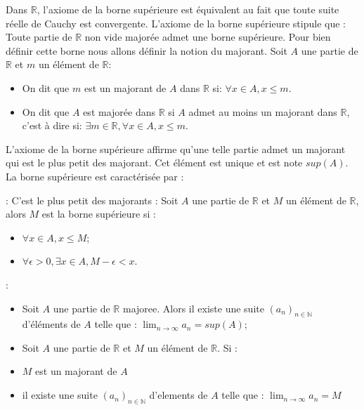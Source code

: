 \documentclass[letterpaper,10pt,french]{sphinxmanual}
\begin{document}
\sphinxAtStartPar
Dans \(\mathbb R\), l’axiome de la borne supérieure est équivalent au fait que toute suite réelle de Cauchy est convergente. L’axiome de la borne supérieure stipule que : Toute partie de \(\mathbb R\) non vide majorée admet une borne supérieure. Pour bien définir cette borne nous allons définir la notion du majorant.
Soit \(A\) une partie de \(\mathbb R\) et \(m\) un élément de \(\mathbb R\):
\begin{itemize}
\item {} 
\sphinxAtStartPar
On dit que \(m\) est un majorant de \(A\) dans \(\mathbb R\) si: \(\forall x \in A , x \leq m\).

\item {} 
\sphinxAtStartPar
On dit que \(A\) est majorée dans \(\mathbb R\) si \(A\) admet au moins un majorant dans \(\mathbb R\), c’est à dire si: \(\exists m \in \mathbb R, \forall x \in A , x \leq m\).

\end{itemize}

\sphinxAtStartPar
L’axiome de la borne supérieure affirme qu’une telle partie admet un majorant qui est le plus petit des majorant. Cet élément est unique et est note \(sup(A)\). La borne supérieure est caractérisée par :

\sphinxAtStartPar
{}: C’est le plus petit des majorants : Soit \(A\) une partie de \(\mathbb R\) et \(M\) un élément de \(\mathbb R\), alors \(M\) est la borne supérieure si :
\begin{itemize}
\item {} 
\sphinxAtStartPar
\(\forall x \in A, x\leq M\);

\item {} 
\sphinxAtStartPar
\(\forall \epsilon>0, \exists x \in A, M-\epsilon < x\).

\end{itemize}

\sphinxAtStartPar
{}:
\begin{itemize}
\item {} 
\sphinxAtStartPar
Soit \(A\) une partie de \(\mathbb R\) majoree. Alors il existe une suite \((a_n)_{n\in \mathbb N}\) d’éléments de \(A\) telle que : \(\lim_{n \to \infty}a_n = sup(A)\);

\item {} 
\sphinxAtStartPar
Soit \(A\) une partie de \(\mathbb R\) et \(M\) un élément de \(\mathbb R\). Si :

\end{itemize}
\begin{itemize}
\item {} 
\sphinxAtStartPar
\(M\) est un majorant de \(A\)

\item {} 
\sphinxAtStartPar
il existe une suite \((a_n)_{n\in \mathbb N}\) d’elements de \(A\) telle que : \(\lim_{n \to \infty}a_n = M\)

\end{itemize}
\end{document}
